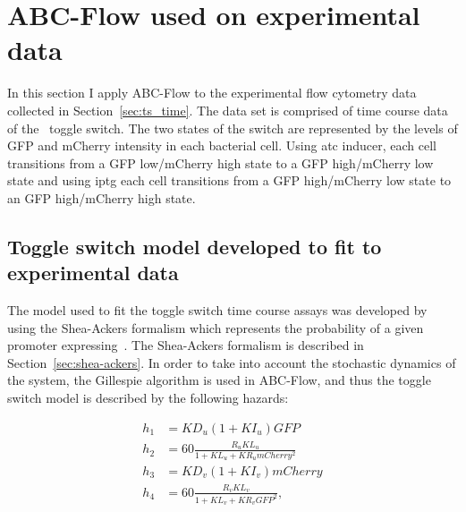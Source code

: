 %

\section{ABC-Flow used on experimental data}
 
In this section I apply ABC-Flow to the experimental flow cytometry data collected in Section~\ref{sec:ts_time}. The data set is comprised of time course data of the~\textcite{Litcofsky:2012gr} toggle switch. The two states of the switch are represented by the levels of GFP and mCherry intensity in each bacterial cell. Using \acrshort{atc} inducer, each cell transitions from a GFP low/mCherry high state to a GFP high/mCherry low state and using \acrshort{iptg} each cell transitions from a GFP high/mCherry low state to an GFP high/mCherry high state. 


\subsection{Toggle switch model developed to fit to experimental data}
\label{sec:Real_model}
The model used to fit the toggle switch time course assays was developed by using the Shea-Ackers formalism which represents the probability of a given promoter expressing~\autocite{Ackers:1982tq}. The Shea-Ackers formalism is described in Section~\ref{sec:shea-ackers}. In order to take into account the stochastic dynamics of the system, the Gillespie algorithm is used in ABC-Flow, and thus the toggle switch model is described by the following hazards:

\begin{align}
h_1 &= KD_u  (1 + KI_u)  GFP\\
h_2 &= 60  \frac{R_u KL_u}{1 + KL_u + KR_u  mCherry^2}\\
h_3 &= KD_v  (1 + KI_v)  mCherry\\
h_4 &= 60  \frac{R_v  KL_v}{1+ KL_v + KR_v  GFP^2},
\end{align}    
    
